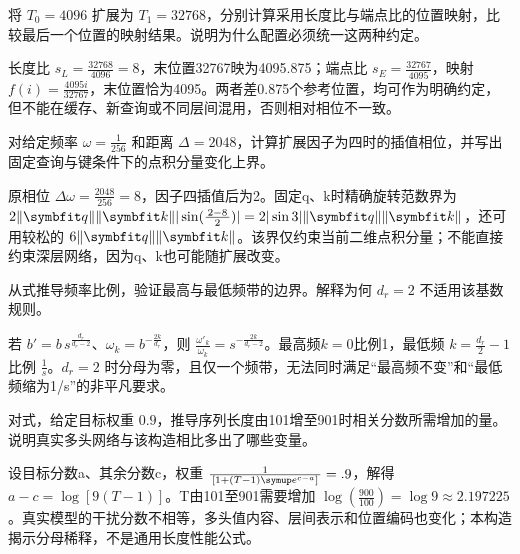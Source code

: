 
\begin{exercises}
\begin{exercise} 将 $T_0=4096$ 扩展为 $T_1=32768$，分别计算采用长度比与端点比的位置映射，比较最后一个位置的映射结果。说明为什么配置必须统一这两种约定。

\begin{solution}
长度比 $s_L=\frac{32768}{4096}=8$，末位置32767映为4095.875；端点比 $s_E=\frac{32767}{4095}$，映射 $f(i)=\frac{4095i}{32767}$，末位置恰为4095。两者差0.875个参考位置，均可作为明确约定，但不能在缓存、新查询或不同层间混用，否则相对相位不一致。
\end{solution}
\end{exercise}

\begin{exercise}\optional 对给定频率 $\omega=\frac{1}{256}$ 和距离 $\Delta=2048$，计算扩展因子为四时的插值相位，并写出固定查询与键条件下的点积分量变化上界。

\begin{solution}
原相位 $\Delta\omega=\frac{2048}{256}=8$，因子四插值后为2。固定q、k时精确旋转范数界为 $2\|\vect{q}\|\|\vect{k}\||\sin(\frac{2-8}{2})|=2|\sin3|\|\vect{q}\|\|\vect{k}\|$，还可用较松的 $6\|\vect{q}\|\|\vect{k}\|$。该界仅约束当前二维点积分量；不能直接约束深层网络，因为q、k也可能随扩展改变。
\end{solution}
\end{exercise}

\begin{exercise}\optional 从式推导频率比例，验证最高与最低频带的边界。解释为何 $d_r=2$ 不适用该基数规则。

\begin{solution}
若 $b'=b\,s^{\frac{d_r}{d_r-2}}$、$\omega_k=b^{-\frac{2k}{d_r}}$，则 $\frac{\omega'_k}{\omega_k}=s^{-\frac{2k}{d_r-2}}$。最高频$k=0$比例1，最低频 $k=\frac{d_r}{2}-1$ 比例 $\frac{1}{s}$。$d_r=2$ 时分母为零，且仅一个频带，无法同时满足“最高频不变”和“最低频缩为1/s”的非平凡要求。
\end{solution}
\end{exercise}

\begin{exercise}\optional 对式，给定目标权重 $0.9$，推导序列长度由101增至901时相关分数所需增加的量。说明真实多头网络与该构造相比多出了哪些变量。

\begin{solution}
设目标分数a、其余分数c，权重 $\frac{1}{[1+(T-1)\conste{}^{c-a}]}=.9$，解得 $a-c=\log[9(T-1)]$。T由101至901需要增加 $\log(\frac{900}{100})=\log9\approx2.197225$。真实模型的干扰分数不相等，多头值内容、层间表示和位置编码也变化；本构造揭示分母稀释，不是通用长度性能公式。
\end{solution}
\end{exercise}


\end{exercises}

